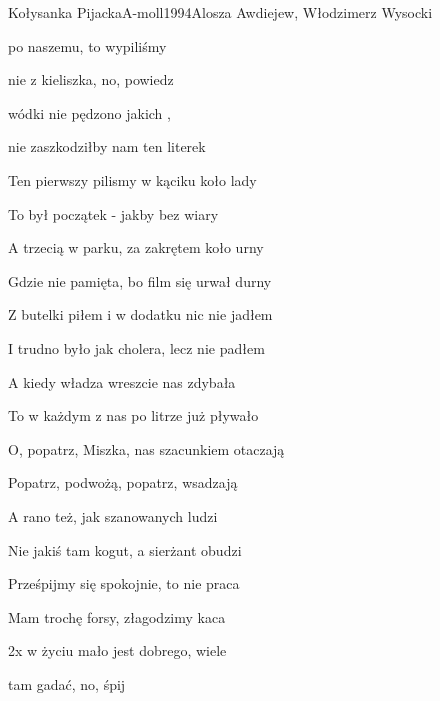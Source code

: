 \begin{song}{Kołysanka Pijacka}{A-moll}{1994}{Alosza Awdiejew, Włodzimerz Wysocki}{}{}
  \begin{SBVerse}
     po naszemu, to wypiliśmy 

     nie z kieliszka, no, powiedz  

     wódki nie pędzono jakich ,

     nie zaszkodziłby nam ten literek 
  \end{SBVerse}
  \begin{SBVerse}
    Ten pierwszy pilismy w kąciku koło lady

    To był początek - jakby bez wiary

    A trzecią w parku, za zakrętem koło urny

    Gdzie nie pamięta, bo film się urwał durny
  \end{SBVerse}
  \begin{SBVerse}
    Z butelki piłem i w dodatku nic nie jadłem

    I trudno było jak cholera, lecz nie padłem

    A kiedy władza wreszcie nas zdybała

    To w każdym z nas po litrze już pływało
  \end{SBVerse}
  \begin{SBVerse}
    O, popatrz, Miszka, nas szacunkiem otaczają

    Popatrz, podwożą, popatrz, wsadzają

    A rano też, jak szanowanych ludzi

    Nie jakiś tam kogut, a sierżant obudzi
  \end{SBVerse}
  \begin{SBVerse}
    Prześpijmy się spokojnie, to nie praca

    Mam trochę forsy, złagodzimy kaca
  \end{SBVerse}
  \begin{SBBracket}{2x}
     w życiu mało jest dobrego, wiele 

     tam gadać, no, śpij  
  \end{SBBracket}
\end{song}
